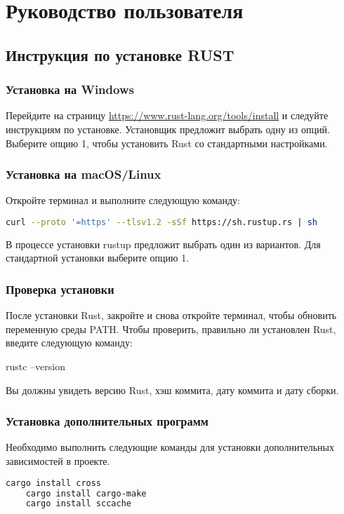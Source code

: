 \section{Руководство пользователя}

\subsection{Инструкция по установке RUST}

\subsubsection{Установка на Windows}
	Перейдите на страницу \url{https://www.rust-lang.org/tools/install} и следуйте инструкциям по установке.
    Установщик предложит выбрать одну из опций. Выберите опцию 1, чтобы установить Rust со стандартными настройками.

\subsubsection{Установка на macOS/Linux}
Откройте терминал и выполните следующую команду:

\begin{lstlisting}[language=bash]
curl --proto '=https' --tlsv1.2 -sSf https://sh.rustup.rs | sh
\end{lstlisting}


В процессе установки rustup предложит выбрать один из вариантов. Для стандартной установки выберите опцию 1.

\subsubsection{Проверка установки}
	После установки Rust, закройте и снова откройте терминал, чтобы обновить переменную среды PATH.
	Чтобы проверить, правильно ли установлен Rust, введите следующую команду:
\begin{lstinline}[language=bash]
rustc --version
\end{lstinline}
Вы должны увидеть версию Rust, хэш коммита, дату коммита и дату сборки.


\subsubsection{Установка дополнительных программ}
Необходимо выполнить следующие команды для установки дополнительных зависимостей
в проекте. 

\begin{lstlisting}[language=bash]
    cargo install cross
    cargo install cargo-make
    cargo install sccache
\end{lstlisting}

